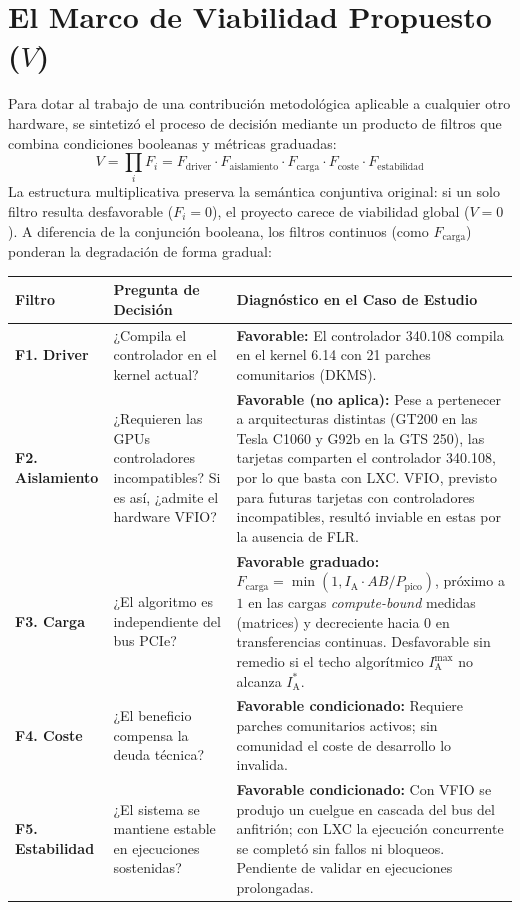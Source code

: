\documentclass[a4paper,11pt]{article}
\begin{document}
\section{El Marco de Viabilidad Propuesto (\texorpdfstring{$V$}{V})}\label{sec:marcoV}

Para dotar al trabajo de una contribución metodológica aplicable a cualquier otro hardware, se sintetizó el proceso de decisión
mediante un producto de filtros que combina condiciones booleanas y métricas graduadas:
\[
V = \prod_{i} F_i = F_{\text{driver}} \cdot F_{\text{aislamiento}} \cdot F_{\text{carga}} \cdot F_{\text{coste}} \cdot F_{\text{estabilidad}}
\]
La estructura multiplicativa preserva la semántica conjuntiva original: si un solo filtro resulta desfavorable ($F_i = 0$), el
proyecto carece de viabilidad global ($V = 0$). A diferencia de la conjunción booleana, los filtros continuos (como
$F_{\text{carga}}$) ponderan la degradación de forma gradual:

\begin{center}
\small
\begin{tabular}{l>{\raggedright\arraybackslash}p{3.5cm}p{7.5cm}}
\toprule
\textbf{Filtro} & \textbf{Pregunta de Decisión} & \textbf{Diagnóstico en el Caso de Estudio} \\
\midrule
\textbf{F1. Driver} & ¿Compila el controlador en el kernel actual? & \textbf{Favorable:} El controlador 340.108 compila en el kernel 6.14 con 21 parches comunitarios (DKMS). \\
\textbf{F2. Aislamiento} & ¿Requieren las GPUs controladores incompatibles? Si es así, ¿admite el hardware VFIO? & \textbf{Favorable (no aplica):} Pese a pertenecer a arquitecturas distintas (GT200 en las Tesla C1060 y G92b en la GTS 250), 
las tarjetas comparten el controlador 340.108, por lo que basta con LXC. VFIO, previsto para futuras tarjetas con controladores incompatibles, resultó inviable en estas por la ausencia de FLR. \\
\textbf{F3. Carga} & ¿El algoritmo es independiente del bus PCIe? & \textbf{Favorable graduado:} $F_{\text{carga}} = \min(1, I_{\text{A}} \cdot AB / P_{\text{pico}})$, próximo a $1$ en las cargas \textit{compute-bound} medidas (matrices) y decreciente hacia $0$ en transferencias continuas. Desfavorable sin remedio si el techo algorítmico $I_{\text{A}}^{\max}$ no alcanza $I_{\text{A}}^*$. \\
\textbf{F4. Coste} & ¿El beneficio compensa la deuda técnica? & \textbf{Favorable condicionado:} Requiere parches comunitarios activos; sin comunidad el coste de desarrollo lo invalida. \\
\textbf{F5. Estabilidad} & ¿El sistema se mantiene estable en ejecuciones sostenidas? & \textbf{Favorable condicionado:} Con VFIO se produjo un cuelgue en cascada del bus del anfitrión; con LXC la ejecución concurrente se completó sin fallos ni bloqueos. Pendiente de validar en ejecuciones prolongadas. \\
\bottomrule
\end{tabular}
\end{center}
\end{document}
